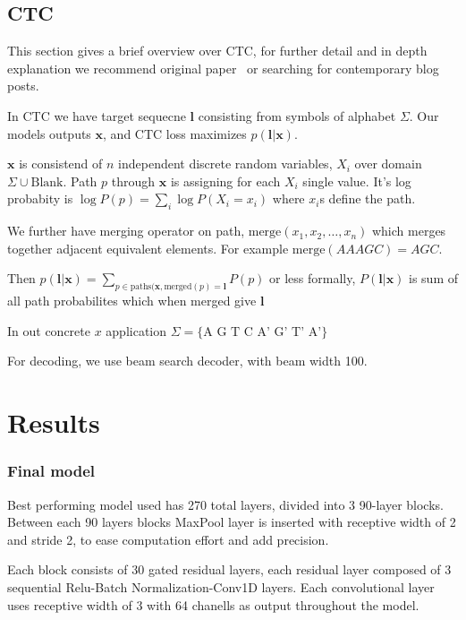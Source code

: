\documentclass[times, utf8, seminar, numeric]{fer}
\begin{document}
\section{CTC}

This section gives a brief overview over CTC, for further detail and in depth explanation we recommend original paper~\cite{graves2006connectionist} or searching for contemporary blog posts.

In CTC we have target sequecne $\mathbf{l}$ consisting from symbols of alphabet $\Sigma$. Our models outputs $\mathbf{x}$, and CTC loss maximizes $p(\mathbf{l}|\mathbf{x})$.

$\mathbf{x}$ is consistend of $n$ independent discrete random variables, $X_i$  over domain $\Sigma \cup \text{Blank}$. Path $p$ through $\mathbf{x}$ is assigning for each $X_i$ single value. It's log probabity is $\log P(p) = \sum_i {\log P(X_i=x_i)}$ where $x_i$s define the path.

We further have merging operator on path, $\text{merge}(x_1, x_2, \ldots, x_n)$ which merges together adjacent equivalent elements. For example $\text{merge}(AAAGC) = AGC$.

Then $p(\mathbf{l}|\mathbf{x}) = \sum_{p\in\text{paths}(\mathbf{x}, \text{merged}(p) = \mathbf{l}}{P(p)}$ or less formally, $P(\mathbf{l}|\mathbf{x})$ is sum of all path probabilites which when merged give $\mathbf{l}$

In out concrete $x$ application $\Sigma = \{\text{A G T C A' G' T' A'}\}$

For decoding, we use beam search decoder, with beam width 100.

\chapter{Results}

\subsection{Final model}

Best performing model used has 270 total layers, divided into 3 90-layer blocks. Between each 90 layers blocks MaxPool layer is inserted with receptive width of 2 and stride 2, to ease computation effort and add precision.

Each block consists of 30 gated residual layers, each residual layer composed of 3 sequential Relu-Batch Normalization-Conv1D layers. Each convolutional layer uses receptive width of 3 with 64 chanells as output throughout the model.
\end{document}
